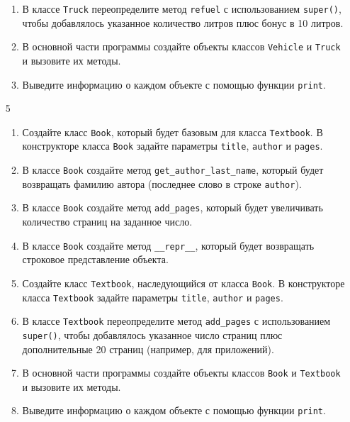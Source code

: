 \begin{enumerate}
\begin{enumerate}
    \item В классе \texttt{Truck} переопределите метод \texttt{refuel} с использованием \texttt{super()}, чтобы добавлялось указанное количество литров плюс бонус в 10 литров.
    
    \item В основной части программы создайте объекты классов \texttt{Vehicle} и \texttt{Truck} и вызовите их методы.
    
    \item Выведите информацию о каждом объекте с помощью функции \texttt{print}.
\end{enumerate}

\item[5] 
\begin{enumerate}
    \item Создайте класс \texttt{Book}, который будет базовым для класса \texttt{Textbook}. В конструкторе класса \texttt{Book} задайте параметры \texttt{title}, \texttt{author} и \texttt{pages}.
    
    \item В классе \texttt{Book} создайте метод \texttt{get\_author\_last\_name}, который будет возвращать фамилию автора (последнее слово в строке \texttt{author}).
    
    \item В классе \texttt{Book} создайте метод \texttt{add\_pages}, который будет увеличивать количество страниц на заданное число.
    
    \item В классе \texttt{Book} создайте метод \texttt{\_\_repr\_\_}, который будет возвращать строковое представление объекта.
    
    \item Создайте класс \texttt{Textbook}, наследующийся от класса \texttt{Book}. В конструкторе класса \texttt{Textbook} задайте параметры \texttt{title}, \texttt{author} и \texttt{pages}.
    
    \item В классе \texttt{Textbook} переопределите метод \texttt{add\_pages} с использованием \texttt{super()}, чтобы добавлялось указанное число страниц плюс дополнительные 20 страниц (например, для приложений).
    
    \item В основной части программы создайте объекты классов \texttt{Book} и \texttt{Textbook} и вызовите их методы.
    
    \item Выведите информацию о каждом объекте с помощью функции \texttt{print}.
\end{enumerate}


\end{enumerate}
